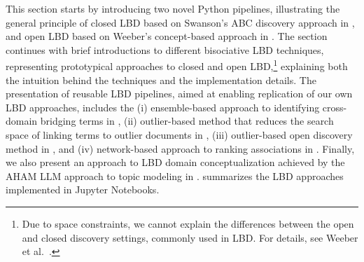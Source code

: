 \documentclass[runningheads]{llncs}
\begin{document}
This section starts by introducing two novel Python pipelines, illustrating the general principle of closed LBD based on Swanson's ABC discovery approach in , and open LBD based on Weeber's concept-based approach in . The section continues with brief introductions to different bisociative LBD techniques, representing prototypical approaches to closed and open LBD,\footnote{Due to space constraints, we cannot explain the differences between the open and closed discovery settings, commonly used in LBD. For details, see Weeber et al.~\cite{weeber2001using}.} explaining both the intuition behind the techniques and the implementation details. The presentation of reusable LBD pipelines, aimed at enabling replication of our own LBD approaches, includes the
(i) ensemble-based approach to identifying cross-domain bridging terms in , 
(ii) outlier-based method that reduces the search space of linking terms to outlier documents in , 
(iii) outlier-based open discovery method in , and
(iv) network-based approach to ranking associations in .
Finally, we also present an approach to LBD domain conceptualization achieved by the AHAM LLM approach to topic modeling in .  summarizes the LBD approaches implemented in Jupyter Notebooks.
\end{document}
